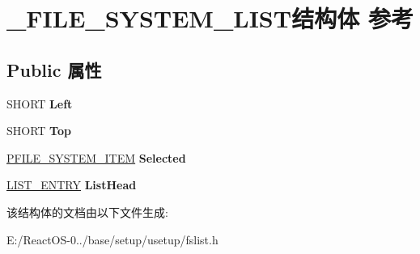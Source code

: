\hypertarget{struct___f_i_l_e___s_y_s_t_e_m___l_i_s_t}{}\section{\+\_\+\+F\+I\+L\+E\+\_\+\+S\+Y\+S\+T\+E\+M\+\_\+\+L\+I\+S\+T结构体 参考}
\label{struct___f_i_l_e___s_y_s_t_e_m___l_i_s_t}
\subsection*{Public 属性}
\begin{DoxyCompactItemize}
\item 
\mbox{\label{struct___f_i_l_e___s_y_s_t_e_m___l_i_s_t_ad4a90fe1877e7f9b2e63165adf6365ad}} 
S\+H\+O\+RT {\bfseries Left}
\item 
\mbox{\label{struct___f_i_l_e___s_y_s_t_e_m___l_i_s_t_ab0d0e135e61f4b8e5f003e738df67398}} 
S\+H\+O\+RT {\bfseries Top}
\item 
\mbox{\label{struct___f_i_l_e___s_y_s_t_e_m___l_i_s_t_ab5636cefcc3ff7fd3a640590446d5565}} 
\hyperlink{struct___f_i_l_e___s_y_s_t_e_m___i_t_e_m}{P\+F\+I\+L\+E\+\_\+\+S\+Y\+S\+T\+E\+M\+\_\+\+I\+T\+EM} {\bfseries Selected}
\item 
\mbox{\label{struct___f_i_l_e___s_y_s_t_e_m___l_i_s_t_ad11fdb01fa95575ed7095b61884aceb0}} 
\hyperlink{struct___l_i_s_t___e_n_t_r_y}{L\+I\+S\+T\+\_\+\+E\+N\+T\+RY} {\bfseries List\+Head}
\end{DoxyCompactItemize}


该结构体的文档由以下文件生成\+:\begin{DoxyCompactItemize}
\item 
E\+:/\+React\+O\+S-\/0../base/setup/usetup/fslist.\+h\end{DoxyCompactItemize}
